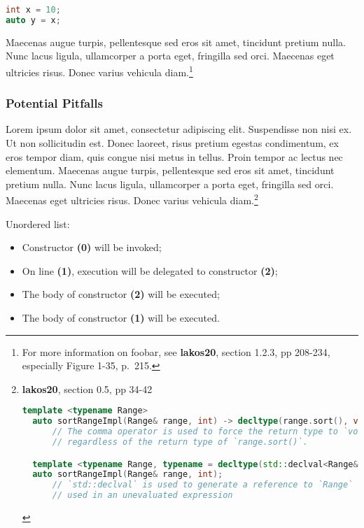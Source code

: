 \documentclass[twoside,10pt,letterpaper,usenames]{newstyle-PearsonGeneric-7-38}
\begin{document}
\begin{lstlisting}[language=C++, caption={missing caption}, label={testlabel}, frame=tb]
int x = 10;
auto y = x;
\end{lstlisting}
    

Maecenas augue turpis, pellentesque sed eros sit amet, tincidunt pretium
nulla. Nunc lacus ligula, ullamcorper a porta eget, fringilla sed orci.
Maecenas eget ultricies risus. Donec varius vehicula
diam.{\cprotect\footnote{For more information on foobar, see
  \textbf{lakos20}, section 1.2.3, pp 208-234, especially Figure 1-35,
  p.~215.}}

\subsubsection[Potential Pitfalls]{Potential Pitfalls}\label{potential-pitfalls}

Lorem ipsum dolor sit amet, consectetur adipiscing elit. Suspendisse non
nisi ex. Ut non sollicitudin est. Donec laoreet, risus pretium egestas
condimentum, ex eros tempor diam, quis congue nisi metus in tellus.
Proin tempor ac lectus nec elementum. Maecenas augue turpis,
pellentesque sed eros sit amet, tincidunt pretium nulla. Nunc lacus
ligula, ullamcorper a porta eget, fringilla sed orci. Maecenas eget
ultricies risus. Donec varius vehicula diam.{\cprotect\footnote{\textbf{lakos20},
  section 0.5, pp 34-42

  \begin{lstlisting}[language=C++, label={testlabel}, basicstyle={\ttfamily\footnotesize}]
  template <typename Range>
  auto sortRangeImpl(Range& range, int) -> decltype(range.sort(), void());
      // The comma operator is used to force the return type to `void`,
      // regardless of the return type of `range.sort()`.

  template <typename Range, typename = decltype(std::declval<Range&>().sort()>
  auto sortRangeImpl(Range& range, int);
      // `std::declval` is used to generate a reference to `Range` that can be
      // used in an unevaluated expression
  \end{lstlisting}
      }}

Unordered list:

\begin{itemize}
\item{Constructor \textbf{(0)} will be invoked;}
\item{On line \textbf{(1)}, execution will be delegated to constructor \textbf{(2)};}
\item{The body of constructor \textbf{(2)} will be executed;}
\item{The body of constructor \textbf{(1)} will be executed.}
\end{itemize}
\end{document}
